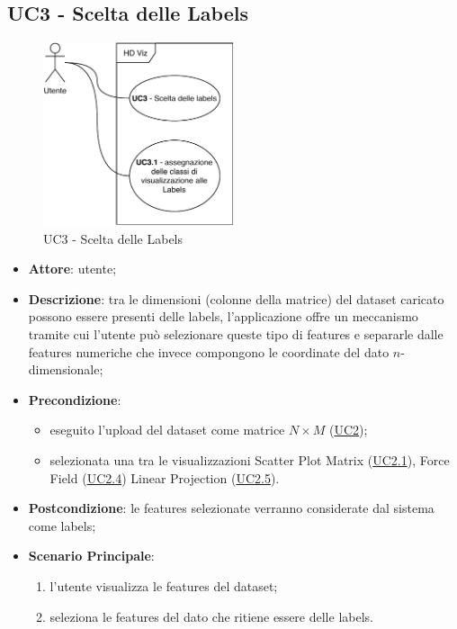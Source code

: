 \subsection{UC3 - Scelta delle Labels}
\label{uc3}

    \begin{figure}[htbp]
        \centering
        \includegraphics[width=0.5\textwidth]{source/sections/casi-uso/diagrams/uc3.pdf}
        \caption{UC3 - Scelta delle Labels}
        \label{fig:uc3}
    \end{figure}


    \begin{itemize}
    \item \textbf{Attore}: utente;
    \item \textbf{Descrizione}: tra le dimensioni (colonne della matrice) del dataset caricato possono essere presenti delle labels, l'applicazione offre un meccanismo tramite cui l'utente può selezionare queste tipo di features e separarle dalle features numeriche che invece compongono le coordinate del dato $n$-dimensionale;
    \item \textbf{Precondizione}:
    \begin{itemize}
        \item eseguito l'upload del dataset come matrice $N\times M$ (\hyperref[uc2]{UC2});
        \item selezionata una tra le visualizzazioni Scatter Plot Matrix (\hyperref[uc2.1]{UC2.1}), Force Field (\hyperref[uc2.4]{UC2.4}) Linear Projection (\hyperref[uc2.5]{UC2.5}).
    \end{itemize}
    \item \textbf{Postcondizione}: le features selezionate verranno considerate dal sistema come labels;
    \item \textbf{Scenario Principale}: 
    \begin{enumerate}
        \item l'utente visualizza le features del dataset;
        \item seleziona le features del dato che ritiene essere delle labels.
    \end{enumerate}  
    \end{itemize}
    
